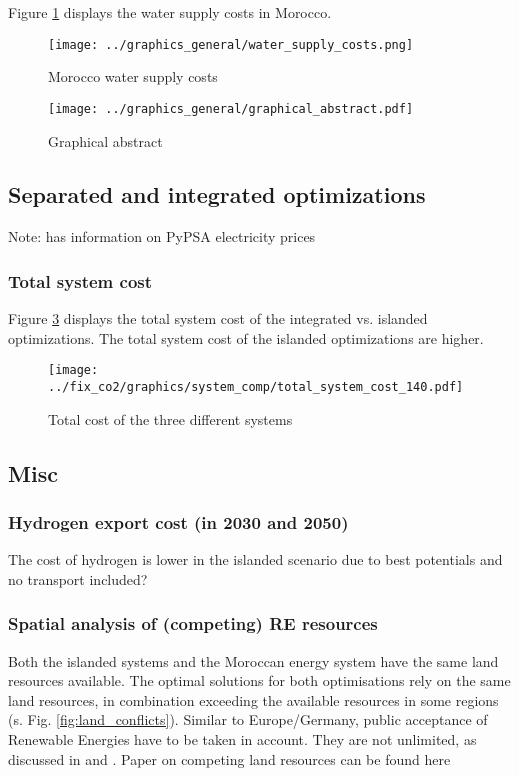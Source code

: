 Figure \ref{fig:morocco_water} displays the water supply costs in Morocco.

\begin{figure}[h!]
    \centering
    \texttt{[image: ../graphics\_general/water\_supply\_costs.png]}
    \caption{Morocco water supply costs}
    \label{fig:morocco_water}
\end{figure}


\begin{figure}[h!]
    \centering
    \texttt{[image: ../graphics\_general/graphical\_abstract.pdf]}
    \caption{Graphical abstract}
    \label{fig:graphical_abstract}
\end{figure}

\subsection{Separated and integrated optimizations}
\label{subsec: sep_int_opti}

Note: \cite{Zeyen2022} has information on PyPSA electricity prices

\subsubsection{Total system cost}
Figure \ref{fig:int_sep_total_system_cost} displays the total system cost
of the integrated vs. islanded optimizations. The total system cost of the
islanded optimizations are higher.

\begin{figure}[h!]
    \centering
    \texttt{[image: ../fix\_co2/graphics/system\_comp/total\_system\_cost\_140.pdf]}
    \caption{Total cost of the three different systems}
    \label{fig:int_sep_total_system_cost}
\end{figure}

\subsection{Misc}

\subsubsection{Hydrogen export cost (in 2030 and 2050)}
The cost of hydrogen is lower in the islanded scenario due to best potentials and no transport included?

\subsubsection{Spatial analysis of (competing) RE resources}
Both the islanded systems and the Moroccan energy system have the same land resources available. 
The optimal solutions for both optimisations rely on the same land resources, in combination exceeding the 
available resources in some regions (s. Fig. \ref{fig:land_conflicts}). 
Similar to Europe/Germany, public acceptance of Renewable Energies have to be taken in account. 
They are not unlimited, as discussed in \cite{Hanger2016} and \cite{TerraponPfaff2019}.
Paper on competing land resources can be found here \cite{Patankar2022}


